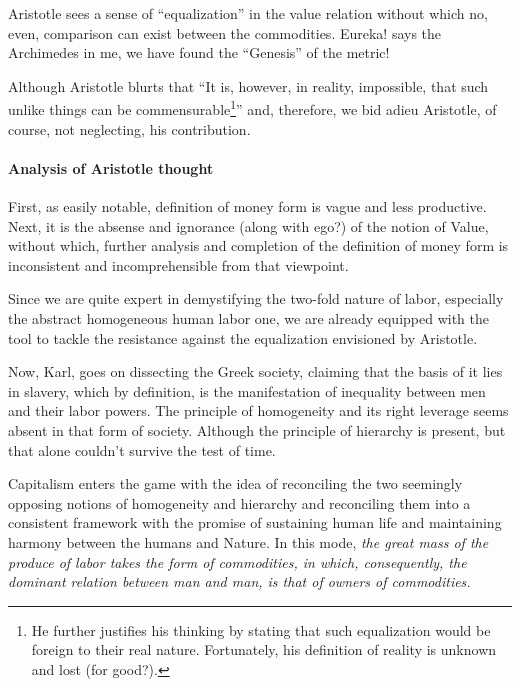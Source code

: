 \documentclass[12pt]{extarticle}
\theoremstyle{definition}
\begin{document}
Aristotle sees a sense of ``equalization'' in the value relation without which no, even, comparison can exist between the commodities.  Eureka! says the Archimedes in me, we have found the ``Genesis'' of the metric!

Although Aristotle blurts that ``It is, however, in reality, impossible, that such unlike things can be commensurable\footnote{He further justifies his thinking by stating that such equalization would be foreign to their real nature.  Fortunately, his definition of reality is unknown and lost (for good?).}'' and, therefore, we bid adieu Aristotle, of course, not neglecting, his contribution.

\paragraph{Analysis of Aristotle thought}
First, as easily notable, definition of money form is vague and less productive.  Next, it is the absense and ignorance (along with ego?) of the notion of Value, without which, further analysis and completion of the definition of money form is inconsistent and incomprehensible from that viewpoint.

Since we are quite expert in demystifying the two-fold nature of labor, especially the abstract homogeneous human labor one, we are already equipped with the tool to tackle the resistance against the equalization envisioned by Aristotle.

Now, Karl, goes on dissecting the Greek society, claiming that the basis of it lies in slavery, which by definition, is the manifestation of inequality between men and their labor powers.  The principle of homogeneity and its right leverage seems absent in that form of society.  Although the principle of hierarchy is present, but that alone couldn't survive the test of time.

Capitalism enters the game with the idea of reconciling the two seemingly opposing notions of homogeneity and hierarchy and reconciling them into a consistent framework with the promise of sustaining human life and maintaining harmony between the humans and Nature.  In this mode, \emph{the great mass of the produce of labor takes the form of commodities, in which, consequently, the dominant relation between man and man, is that of owners of commodities.}
\end{document}
